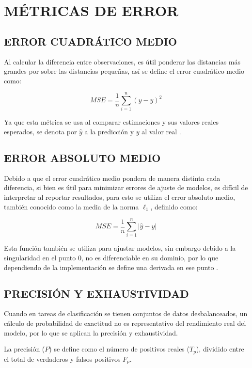 \section{MÉTRICAS DE ERROR}
\subsection{ERROR CUADRÁTICO MEDIO}
Al calcular la diferencia entre observaciones, es útil ponderar las distancias más grandes por sobre las distancias pequeñas, así se define el error cuadrático medio como:

\begin{equation}
	MSE = \frac{1}{n}\sum_{i=1}^n (\hat{y} - y)^2
\end{equation}

Ya que esta métrica se usa al comparar estimaciones y sus valores reales esperados, se denota por $\hat{y}$ a la predicción y $y$ al valor real \citep{hastie01statisticallearning}.

\subsection{ERROR ABSOLUTO MEDIO}
Debido a que el error cuadrático medio pondera de manera distinta cada diferencia, si bien es útil para minimizar errores de ajuste de modelos, es difícil de interpretar al reportar resultados, para esto se utiliza el error absoluto medio, también conocido como la media de la norma $\ell_1$, definido como:

\begin{equation}
	MSE = \frac{1}{n}\sum_{i=1}^n |\hat{y} - y|
\end{equation}

Esta función también se utiliza para ajustar modelos, sin embargo debido a la singularidad en el punto $0$, no es diferenciable en su dominio, por lo que dependiendo de la implementación se define una derivada en ese punto \citep{hastie01statisticallearning}.

\subsection{PRECISIÓN Y EXHAUSTIVIDAD}
Cuando en tareas de clasificación se tienen conjuntos de datos desbalanceados, un cálculo de probabilidad de exactitud no es representativo del rendimiento real del modelo, por lo que se aplican la precisión y exhaustividad.

La precisión ($P$) se define como el número de positivos reales ($T_p$), dividido entre el total de verdaderos y falsos positivos $F_p$.

